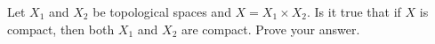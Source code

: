 \begin{comment}

\ExerciseSolution

\ba

\item Let $(X_1, \tau_1)$ and $(X_2, \tau_2)$ be path connected topological spaces. Let $(a,b)$ and $(c,d)$ be in $X_1 \times X_2$. Since $X_1$ and $X_2$ are path connected, there are paths $p$ in $X_1$ from $a$ to $c$ and $q$ in $X_2$ from $b$ to $d$. Define $r: [0,1] \to X_1 \times X_2$ by 
\[r(t) = (p(t), q(t)).\]
Note that $r(0) = (p(0),q(0)) = (a,b)$ and $r(1) = (p(1),q(1)) = (c,d)$. To show that $r$ is a path, we need to show that $r$ is continuous. To do this we show that $\pi_1 \circ r$ and $\pi_2 \circ r$ are continuous, where $\pi_i$ is the projection of $X_1 \times X_2$ to $X_i$. 

For $t \in [0,1]$ we have 
\[(\pi_1 \circ r)(t) = \pi_1(r(t)) = \pi_1((p(t), q(t)) = p(t),\]
so $\pi_1 \circ r = p$, which is continuous. Also, $\pi_2 \circ r = q$, which is continuous. It follows from Theorem \ref{thm:prod_continuity} that $r$ is continuous. Therefore, $r$ is a path in $X_1 \times X_2$ from $(a,b)$ to $(c,d)$ and $X_! \times X_2$ is path connected. 

\item Let $X_1$, $X_2$, $\ldots$, $X_n$ be path connected topological spaces and let $X = \Pi_{i=1}^n X_i$. We proceed by induction on $n$. For $n=1$, the statement is trivial. The $n=2$ case is proved in (a). Assume that for any collection $\{X_i\}_{i=1}^k$ of path connected spaces $X_i$ for some natural number $k$, the product $\Pi_{i=1}^k X_i$ is path connected. Let $X_1$, $X_2$, $\ldots$, $X_k$, $X_{k+1}$ be path connected spaces and let $X = \Pi_{i=1}^{k+1} X_i$. By our induction hypothesis, we know that $\Pi_{i=1}^k X_i$ is path connected. Then, by part(a) we have that $X = \Pi_{i=1}^{k+1} X_i = \Pi_{i=1}^k X_i \times X_{k+1}$ is path connected. We conclude that any finite product of path connected spaces is path connected.

\ea

\end{comment}


\item Let $X_1$ and $X_2$ be topological spaces and $X = X_1 \times X_2$. Is it true that if $X$ is compact, then both $X_1$ and $X_2$ are compact. Prove your answer.

